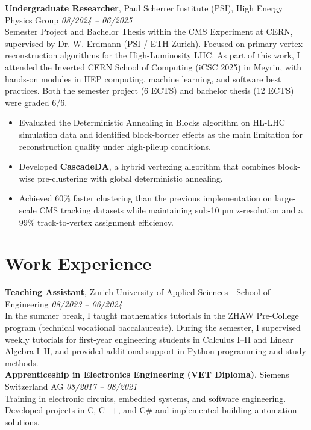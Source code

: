 \documentclass[a4paper,10pt]{article}
\begin{document}
\textbf{Undergraduate Researcher}, Paul Scherrer Institute (PSI), High Energy Physics Group \hfill \textit{08/2024 – 06/2025}\\
Semester Project and Bachelor Thesis within the CMS Experiment at CERN, supervised by Dr. W. Erdmann (PSI / ETH Zurich).
Focused on primary-vertex reconstruction algorithms for the High-Luminosity LHC. As part of this work, I attended the Inverted CERN School of Computing (iCSC 2025) in Meyrin, with hands-on modules in HEP computing, machine learning, and software best practices. Both the semester project (6 ECTS) and bachelor thesis (12 ECTS) were graded 6/6.
\begin{itemize}[leftmargin=1.2em, topsep=2pt, itemsep=2pt]
    \item Evaluated the Deterministic Annealing in Blocks algorithm on HL-LHC simulation data and identified block-border effects as the main limitation for reconstruction quality under high-pileup conditions.
    \item Developed \textbf{CascadeDA}, a hybrid vertexing algorithm that combines block-wise pre-clustering with global deterministic annealing.
    \item Achieved 60\% faster clustering than the previous implementation on large-scale CMS tracking datasets while maintaining sub-10 µm z-resolution and a 99\% track-to-vertex assignment efficiency.
\end{itemize}



\vspace{0.5em}

\section*{Work Experience}

\textbf{Teaching Assistant}, Zurich University of Applied Sciences - School of Engineering \hfill \textit{08/2023 – 06/2024}\\
In the summer break, I taught mathematics tutorials in the ZHAW Pre-College program (technical vocational baccalaureate). During the semester, I supervised weekly tutorials for first-year engineering students in Calculus I–II and Linear Algebra I–II, and provided additional support in Python programming and study methods.
\vspace{0.5em}\\

\textbf{Apprenticeship in Electronics Engineering (VET Diploma)}, Siemens Switzerland AG \hfill \textit{08/2017 – 08/2021}\\
Training in electronic circuits, embedded systems, and software engineering. Developed projects in C, C++, and C\# and implemented building automation solutions.
\end{document}
